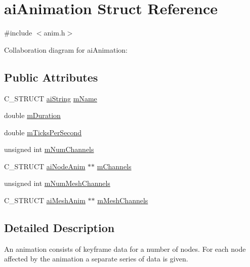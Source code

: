 \hypertarget{structai_animation}{\section{ai\-Animation Struct Reference}
\label{structai_animation}
}


{\ttfamily \#include $<$anim.\-h$>$}



Collaboration diagram for ai\-Animation\-:
\subsection*{Public Attributes}
\begin{DoxyCompactItemize}
\item 
C\-\_\-\-S\-T\-R\-U\-C\-T \hyperlink{structai_string}{ai\-String} \hyperlink{structai_animation_a1be7d78d88694173a7ceef658fea77f1}{m\-Name}
\item 
double \hyperlink{structai_animation_ae2bbc49320b4b75c05e23e0ab704ece7}{m\-Duration}
\item 
double \hyperlink{structai_animation_afd26a40c3f16b6aa6e150effa3eaeab1}{m\-Ticks\-Per\-Second}
\item 
unsigned int \hyperlink{structai_animation_aebfccf9a9aefa6084566d21e8a30b7e5}{m\-Num\-Channels}
\item 
C\-\_\-\-S\-T\-R\-U\-C\-T \hyperlink{structai_node_anim}{ai\-Node\-Anim} $\ast$$\ast$ \hyperlink{structai_animation_a89244bb68b725ffbb85137174c28e757}{m\-Channels}
\item 
unsigned int \hyperlink{structai_animation_ac43aacd8502020174e553501f0b6bf5f}{m\-Num\-Mesh\-Channels}
\item 
C\-\_\-\-S\-T\-R\-U\-C\-T \hyperlink{structai_mesh_anim}{ai\-Mesh\-Anim} $\ast$$\ast$ \hyperlink{structai_animation_af05138121dbde8b31aa031505b454c85}{m\-Mesh\-Channels}
\end{DoxyCompactItemize}


\subsection{Detailed Description}
An animation consists of keyframe data for a number of nodes. For each node affected by the animation a separate series of data is given. 

